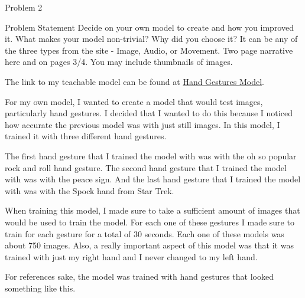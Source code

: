 \begin{problem}{Problem 2}
    \begin{statement}{Problem Statement}
        Decide on your own model to create and how you improved it. What makes your model non-trivial? Why did you choose it? It can be any of the three types from the site - Image, Audio, or Movement. 
        Two page narrative here and on pages 3/4. You may include thumbnails of images.
    \end{statement}

    \begin{highlight}[Solution]
        The link to my teachable model can be found at \href{https://teachablemachine.withgoogle.com/models/dkkzS5pWK/}{Hand Gestures Model}.

        For my own model, I wanted to create a model that would test images, particularly hand gestures. I decided that I wanted to do this because I noticed how accurate the previous model was
        with just still images. In this model, I trained it with three different hand gestures.

        The first hand gesture that I trained the model with was with the oh so popular rock and roll hand gesture. The second hand gesture that I trained the model with was with the peace sign.
        And the last hand gesture that I trained the model with was with the Spock hand from Star Trek. 

        When training this model, I made sure to take a sufficient amount of images that would be used to train the model. For each one of these gestures I made sure to train for each gesture for
        a total of 30 seconds. Each one of these models was about 750 images. Also, a really important aspect of this model was that it was trained with just my right hand and I never changed to
        my left hand.

        For references sake, the model was trained with hand gestures that looked something like this.
        

\end{highlight}
\end{problem}
